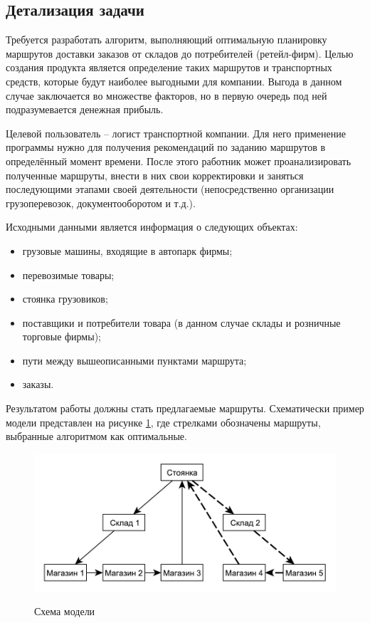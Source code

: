 \subsection{Детализация задачи}
	Требуется разработать алгоритм, выполняющий оптимальную планировку маршрутов доставки заказов от складов до потребителей (ретейл-фирм). Целью создания продукта является определение таких маршрутов и транспортных средств, которые будут наиболее выгодными для компании. Выгода в данном случае заключается во множестве факторов, но в первую очередь под ней подразумевается денежная прибыль.
	
	Целевой пользователь -- логист транспортной компании. Для него применение программы нужно для получения рекомендаций по заданию маршрутов в определённый момент времени. После этого работник может проанализировать полученные маршруты, внести в них свои корректировки и заняться последующими этапами своей деятельности (непосредственно организации грузоперевозок, документооборотом и т.д.).
	
	Исходными данными является информация о следующих объектах:
	\begin{itemize}
		\item грузовые машины, входящие в автопарк фирмы;
		\item перевозимые товары;
		\item стоянка грузовиков;
		\item поставщики и потребители товара (в данном случае склады и розничные торговые фирмы);
		\item пути между вышеописанными пунктами маршрута;
		\item заказы.
	\end{itemize}

	Результатом работы должны стать предлагаемые маршруты. Схематически пример модели представлен на рисунке \ref{pic:model}, где стрелками обозначены маршруты, выбранные алгоритмом как оптимальные.
	
	\begin{figure}[h!] 
		\begin{center}
			{\includegraphics[scale=0.9, angle=0]{img/model.pdf}}
			\caption{Схема модели}
			\label{pic:model}
		\end{center}
	\end{figure}
	
